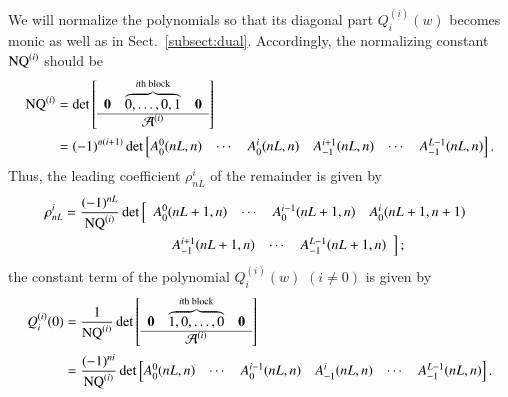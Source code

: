 \documentclass[12pt]{article}
\numberwithin{equation}{section}
\begin{document}
We will normalize the polynomials so that its diagonal part
$Q^{(i)}_i(w)$ becomes monic 
as well as in Sect.~\ref{subsect:dual}.
Accordingly, the normalizing constant ${\rm NQ}^{(i)}$ should be
\begin{align*}
{\rm NQ}^{(i)}
&=\det \left[
\begin{array}{ccc}
{\boldsymbol 0} &
\overbrace{0, \ldots, 0, 1}^{\text{\rm $i$th block}}
 &{\boldsymbol 0} 
 \\  \hline
&{\cal A}^{(i)}&
\end{array}
\right]
\\
&=(-1)^{n(i+1)} \det \begin{bmatrix}
A^0_0(nL,n) & \cdots 
&  A^{i}_{0}(nL,n) &A^{i+1}_{-1}(nL,n)& \cdots   
& A^{L-1}_{-1}(nL,n)
\end{bmatrix}.
\end{align*}
Thus,
the leading coefficient $\rho^i_{nL}$
of the remainder is given by
\begin{align*}
\rho^i_{nL}
&=
\frac{(-1)^{nL}}{{\rm NQ}^{(i)}}
\det
\left[
\begin{array}{cccc}
A^0_0(nL+1,n) 
& \cdots 
&  A^{i-1}_0(nL+1,n) 
&  A^{i}_0(nL+1,n+1) 
\end{array}
\right.
\\
& \qquad \qquad \qquad
\left.
\begin{array}{cccc}
&A^{i+1}_{-1}(nL+1,n) 
& \cdots   
& A^{L-1}_{-1}(nL+1,n)
\end{array}
\right];
\end{align*}
the constant term of the polynomial $Q_i^{(i)}(w)$
$(i \neq 0)$
is given by
\begin{align*}
Q_i^{(i)}(0)
&=\frac{1}{{\rm NQ}^{(i)}}
\det \left[
\begin{array}{ccc}
{\boldsymbol 0} &
\overbrace{1,0, \ldots, 0}^{\text{\rm $i$th block}}
 &{\boldsymbol 0} 
 \\  \hline
&{\cal A}^{(i)}&
\end{array}
\right]
\\
&=\frac{(-1)^{n i}}{{\rm NQ}^{(i)}} 
\det \begin{bmatrix}
A^0_0(nL,n) & \cdots 
&  A^{i-1}_{0}(nL,n) &A^{i}_{-1}(nL,n)& \cdots   
& A^{L-1}_{-1}(nL,n)
\end{bmatrix}.
\end{align*}
\end{document}

